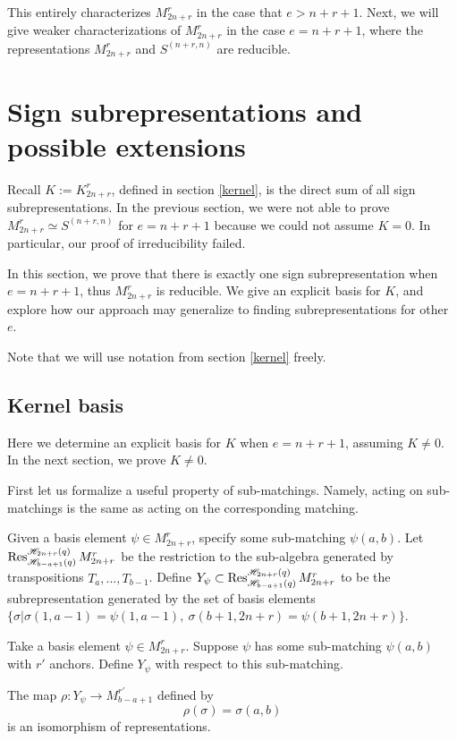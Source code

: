 \documentclass{amsart}
\begin{document}
  This entirely characterizes $M_{2n + r}^r$ in the case that $e > n + r + 1$.
  Next, we will give weaker characterizations of $M_{2n + r}^r$ in the case $e = n + r + 1$, where the representations $M_{2n + r}^r$ and $S^{(n+r,n)}$ are reducible.

 \section{Sign subrepresentations and possible extensions}\label{Sign section}
 Recall $K:=K^r_{2n+r}$, defined in section \ref{kernel}, is the direct sum of all sign subrepresentations. In the previous section, we were not able to prove $M_{2n+r}^r\simeq S^{(n+r,n)}$ for $e=n+r+1$ because we could not assume $K=0$. In particular, our proof of irreducibility failed.
 
 In this section, we prove that there is exactly one sign subrepresentation when $e=n+r+1$, thus $M_{2n+r}^r$ is reducible. We give an explicit basis for $K$, and explore how our approach may generalize to finding subrepresentations for other $e$.
 
 Note that we will use notation from section \ref{kernel} freely.
 
 
 \subsection{Kernel basis}
 
 
 Here we determine an explicit basis for $K$ when $e=n+r+1$, assuming $K\not=0$. In the next section, we prove $K\not=0$.
 
 First let us formalize a useful property of sub-matchings. Namely, acting on sub-matchings is the same as acting on the corresponding matching.
 
 \begin{definition}
 	Given a basis element $\psi\in M_{2n+r}^r$, specify some sub-matching $\psi(a,b)$. Let $\operatorname{Res}_{\mathscr{H}_{b-a+1}(q)}^{\mathscr{H}_{2n+r}(q)}M_{2n+r}^r$ be the restriction to the sub-algebra generated by transpositions $T_a,...,T_{b-1}$. Define $Y_\psi\subset\operatorname{Res}_{\mathscr{H}_{b-a+1}(q)}^{\mathscr{H}_{2n+r}(q)}M_{2n+r}^r$ to be the subrepresentation generated by the set of basis elements $\{\sigma| \sigma(1,a-1)=\psi(1,a-1),\ \sigma(b+1,2n+r)=\psi(b+1,2n+r)\}$.
 \end{definition}
 
 \begin{lemma}
 	Take a basis element $\psi\in M_{2n+r}^r$. Suppose $\psi$ has some sub-matching $\psi(a,b)$ with $r'$ anchors. Define $Y_\psi$ with respect to this sub-matching.
 	
 	The map $\rho:Y_\psi\rightarrow M_{b-a+1}^{r'}$ defined by $$\rho(\sigma)=\sigma(a,b)$$ is an isomorphism of representations.
 	
 	\label{sub-matching isomorphism}
 \end{lemma}
 
\end{document}
